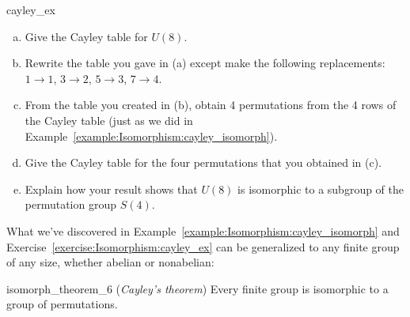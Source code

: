 \begin{exercise}{cayley_ex}
\begin{enumerate}[(a)]
\item
Give the Cayley table for $U(8)$.
\item
Rewrite the table you gave in (a) except make the following replacements:  $1 \rightarrow 1$, $3 \rightarrow 2$, $5 \rightarrow 3$, $7 \rightarrow 4$. 
\item
From the table you created in (b), obtain 4 permutations from the 4 rows of the Cayley table (just as we did in  Example~\ref{example:Isomorphism:cayley_isomorph}). 
\item
Give the Cayley table for the four permutations that you obtained in (c).
\item
Explain how your result shows that $U(8)$ is isomorphic to a subgroup of the permutation group $S(4)$.
\end{enumerate}
\end{exercise}

What we've discovered in Example~\ref{example:Isomorphism:cayley_isomorph} and Exercise~\ref{exercise:Isomorphism:cayley_ex}
can be generalized to any finite group of any size, whether abelian or nonabelian:

\begin{prop}{isomorph_theorem_6} (\emph{Cayley's theorem}) 
Every finite group is isomorphic to a group of permutations.
\end{prop}

